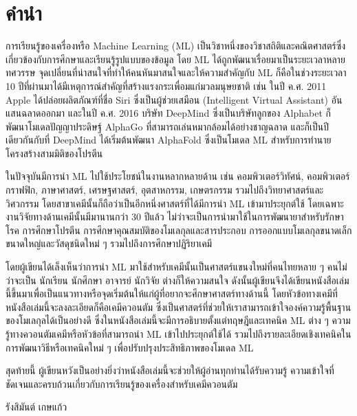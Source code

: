 

\chapter*{\centering คำนำ}

การเรียนรู้ของเครื่องหรือ Machine Learning (ML) เป็นวิชาหนึ่งของวิชาสถิติและคณิตศาสตร์ซึ่งเกี่ยวข้องกับการศึกษาและเรียนรู้รูปแบบของข้อมูล 
โดย ML ได้ถูกพัฒนาเรื่อยมาเป็นระยะเวลาหลายทศวรรษ จุดเปลี่ยนที่น่าสนใจที่ทำให้คนหันมาสนใจและให้ความสำคัญกับ ML
ก็คือในช่วงระยะเวลา 10 ปีที่ผ่านมาได้มีเหตุการณ์สำคัญที่สร้างแรงกระเพื่อมแก่มวลมนุษยชาติ เช่น ในปี ค.ศ. 2011 Apple ได้ปล่อยผลิตภัณฑ์ที่ชื่อ 
Siri ซึ่งเป็นผู้ช่วยเสมือน (Intelligent Virtual Assistant) อันแสนฉลาดออกมา และในปี ค.ศ. 2016 บริษัท DeepMind ซึ่งเป็นบริษัทลูกของ
Alphabet ก็พัฒนาโมเดลปัญญาประดิษฐ์ AlphaGo ที่สามารถเล่นหมากล้อมได้อย่างชาญฉลาด และก็เป็นปีเดียวกันกับที่ DeepMind ได้เริ่มต้นพัฒนา AlphaFold
ซึ่งเป็นโมเดล ML สำหรับการทำนายโครงสร้างสามมิติของโปรตีน

ในปัจจุบันมีการนำ ML ไปใช้ประโยชน์ในงานหลากหลายด้าน เช่น คอมพิวเตอร์วิทัศน์, คอมพิวเตอร์กราฟฟิก, ภาษาศาสตร์, เศรษฐศาสตร์, 
อุตสาหกรรม, เกษตรกรรม รวมไปถึงวิทยาศาสตร์และวิศวกรรม โดยสาขาเคมีนั้นก็ถือว่าเป็นอีกหนึ่งศาสตร์ที่ได้มีการนำ ML เข้ามาประยุกต์ใช้
โดยเฉพาะงานวิจัยทางด้านเคมีนั้นมีมานานกว่า 30 ปีแล้ว ไม่ว่าจะเป็นการนำมาใช้ในการพัฒนายาสำหรับรักษาโรค การศึกษาโปรตีน 
การศึกษาคุณสมบัติของโมเลกุลและสารประกอบ การออกแบบโมเลกุลขนาดเล็ก ขนาดใหญ่และวัสดุชนิดใหม่ ๆ รวมไปถึงการศึกษาปฏิริยาเคมี

โดยผู้เขียนได้เล็งเห็นว่าการนำ ML มาใช้สำหรับเคมีนั้นเป็นศาสตร์แขนงใหม่ที่คนไทยหลาย ๆ คนไม่ว่าจะเป็น นักเรียน นักศึกษา อาจารย์ นักวิจัย
ต่างก็ให้ความสนใจ ดังนั้นผู้เขียนจึงได้เขียนหนังสือเล่มนี้ขึ้นมาเพื่อเป็นแนวทางหรือจุดเริ่มต้นให้แก่ผู้ที่อยากจะศึกษาศาสตร์ทางด้านนี้ 
โดยหัวข้อทางเคมีที่หนังสือเล่มนี้จะลงละเอียดก็คือเคมีควอนตัม ซึ่งเป็นศาสตร์ที่ช่วยให้เราสามารถเข้าใจองค์ความรู้พื้นฐานของโมเลกุลได้เป็นอย่างดี 
ซึ่งในหนังสือเล่มนี้จะมีการอธิบายตั้งแต่ทฤษฎีและเทคนิค ML ต่าง ๆ ความรู้ทางควอนตัมเคมีหรือหัวข้อที่สามารถนำ ML เข้าไปประยุกต์ใช้ได้ 
รวมไปถึงรายละเอียดเชิงเทคนิคในการพัฒนาวิธีหรือเทคนิคใหม่ ๆ เพื่อปรับปรุงประสิทธิภาพของโมเดล ML 

สุดท้ายนี้ ผู้เขียนหวังเป็นอย่างยิ่งว่าหนังสือเล่มนี้จะช่วยให้ผู้อ่านทุกท่านได้รับความรู้ ความเข้าใจที่ชัดเจนและครบถ้วนเกี่ยวกับการเรียนรู้ของเครื่องสำหรับเคมีควอนตัม

\medskip

\begin{flushright}
รังสิมันต์ เกษแก้ว
\end{flushright}